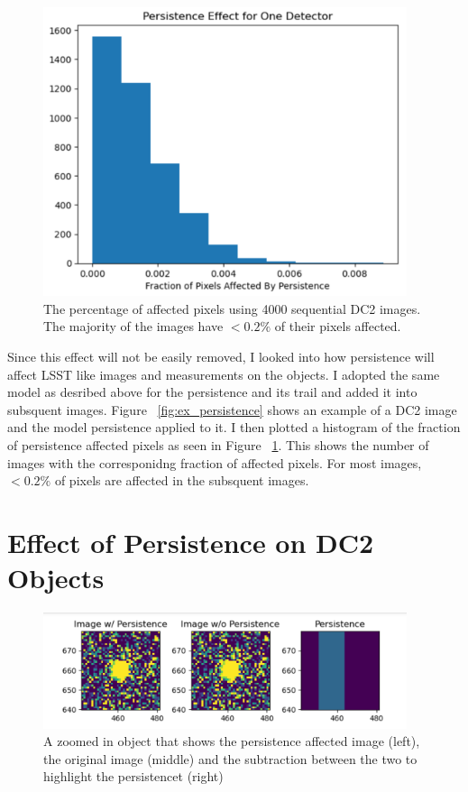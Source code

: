 \documentclass[DM,authoryear,toc]{lsstdoc}
\begin{document}
\begin{figure}[!htp]
  \centering
  \includegraphics[width=0.95\textwidth, angle=0]{DC2_percent_affected_pixels.png}
  \caption{
  The percentage of affected pixels using 4000 sequential DC2 images. The majority of the images have $<0.2\%$ of their pixels affected. 
  }\label{fig:affected_pixels}
\end{figure}


Since this effect will not be easily removed, I looked into how persistence will affect LSST like images and measurements on the objects. 
I adopted the same model as desribed above for the persistence and its trail and added it into subsquent images. 
Figure ~\ref{fig:ex_persistence} shows an example of a DC2 image and the model persistence applied to it. 
I then plotted a histogram of the fraction of persistence affected pixels as seen in Figure ~\ref{fig:affected_pixels}. 
This shows the number of images with the corresponidng fraction of affected pixels. 
For most images, $<0.2\%$ of pixels are affected in the subsquent images.


\section{Effect of Persistence on DC2 Objects}

\begin{figure}[!htp]
  \centering
  \includegraphics[width=0.95\textwidth, angle=0]{Obj_pers.png}
  \caption{
  A zoomed in object that shows the persistence affected image (left), the original image (middle) 
  and the subtraction between the two to highlight the persistencet (right)
  }\label{fig:obj_persistence}
\end{figure}
\end{document}
